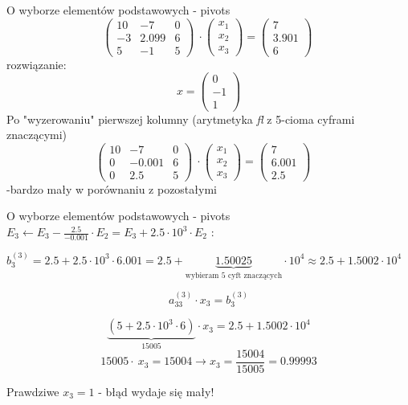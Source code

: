 \begin{frame}{O wyborze elementów podstawowych - pivots}
$$
\left(\begin{array}{lll}
10 & -7 & 0\\
-3 & 2.099 & 6\\
5 & -1 & 5
\end{array}\right)\ \cdot
\left(\begin{array}{l}
x_{1}\\
x_{2}\\
x_{3}
\end{array}\right)=\left(\begin{array}{l}
7\\
3.901\\
6
\end{array}\right)\ 
$$
rozwiązanie:
$$
x=\left(\begin{array}{l}
0\\
-1\\
1
\end{array}\right)
$$
Po "wyzerowaniu"  pierwszej kolumny (arytmetyka {\it fl} z 5-cioma cyframi znaczącymi)
$$
\left(\begin{array}{lll}
10 & -7 & 0\\
0 & -0.001 & 6\\
0 & 2.5 & 5
\end{array}\right)\ \cdot
\left(\begin{array}{l}
x_{1}\\
x_{2}\\
x_{3}
\end{array}\right)=\left(\begin{array}{l}
7\\
6.001\\
2.5
\end{array}\right)\ 
\begin{array}{l}
\\
\\
\\
\end{array}
$$
 -bardzo mały w porównaniu z pozostałymi 

\end{frame}
\begin{frame}{O wyborze elementów podstawowych - pivots}
 $E_{3}\leftarrow E_{3}-\frac{2.5}{-0.001}\cdot E_{2}=E_{3}+2.5\cdot 10^3 \cdot E_{2}$ :
\begin{center}
$b_3^{(3)}=2.5+2.5 \cdot 10^{3}\cdot 6.001 =2.5+ \underbrace{1.50025}_{\text{wybieram 5 cyft znaczących}}\cdot 10^{4} \approx 2.5+ 1.5002\cdot 10^{4}$

$$
a_{33}^{(3)}\cdot x_3=b_3^{(3)}
$$

$$
\underbrace{(5 + 2.5\cdot 10^{3} \cdot 6)}_{15005}\cdot x_{3}= 2.5 + 1.5002\cdot 10^{4}
$$
$$
15005\cdot\ x_{3}=15004\rightarrow x_{3}=\frac{15004}{15005}=0.99993
$$
\end{center}
Prawdziwe $x_{3}=1$ - błąd wydaje się mały!
\newline
\end{frame}
